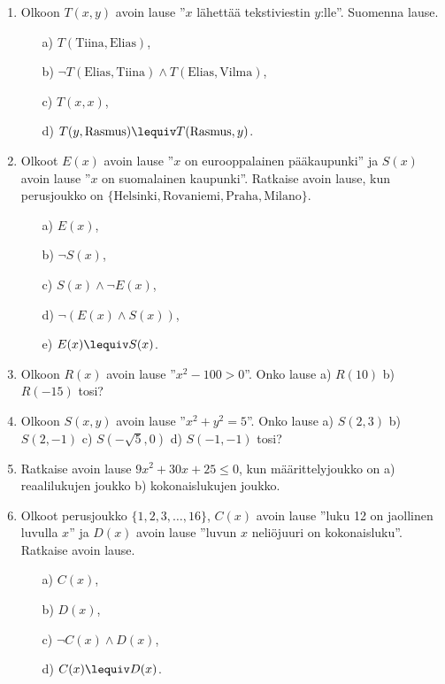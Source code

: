 \begin{enumerate}

\item
Olkoon $T(x,y)$ avoin lause ''$x$ lähettää tekstiviestin
$y$:lle''. Suomenna lause.
\begin{itemize}
\item[a)] $T(\textrm{Tiina}, \textrm{Elias})$,
\item[b)] $\lnot T(\textrm{Elias}, \textrm{Tiina}) \land T(\textrm{Elias}, \textrm{Vilma})$,
\item[c)] $T(x, x)$,
\item[d)] $T(y, \textrm{Rasmus}) \lequiv T(\textrm{Rasmus}, y)$.
\end{itemize}

\item
Olkoot $E(x)$ avoin lause ''$x$ on eurooppalainen
pääkaupunki'' ja $S(x)$ avoin lause ''$x$ on suomalainen
kaupunki''. Ratkaise avoin lause, kun perusjoukko on
$\{\textrm{Helsinki}, \textrm{Rovaniemi}, \textrm{Praha}, \textrm{Milano}\}$.
\begin{itemize}
\item[a)] $E(x)$,
\item[b)] $\lnot S(x)$,
\item[c)] $S(x) \land \lnot E(x)$,
\item[d)] $\lnot (E(x) \land S(x))$,
\item[e)] $E(x) \lequiv S(x)$.
\end{itemize}

\item
Olkoon $R(x)$ avoin lause ''$x^2 - 100 > 0$''. Onko lause
a) $R(10)$ b) $R(-15)$ tosi?

\item
Olkoon $S(x, y)$ avoin lause ''$x^2 + y^2 = 5$''. Onko
lause a) $S(2, 3)$ b) $S(2, -1)$ c) $S(-\sqrt{5}, 0)$ d)
$S(-1, -1)$ tosi?

\item
Ratkaise avoin lause $9x^2 + 30x + 25 \le 0$, kun
määrittelyjoukko on a) reaalilukujen joukko b)
kokonaislukujen joukko.

\item
Olkoot perusjoukko $\{ 1, 2, 3, \ldots , 16\}$, $C(x)$
avoin lause ''luku 12 on jaollinen luvulla $x$'' ja $D(x)$ avoin lause ''luvun $x$ neliöjuuri on kokonaisluku''.
Ratkaise avoin lause.
\begin{itemize}
\item[a)] $C(x)$,
\item[b)] $D(x)$,
\item[c)] $\lnot C(x) \land D(x)$,
\item[d)] $C(x) \lequiv D(x)$.
\end{itemize}


\end{enumerate}
